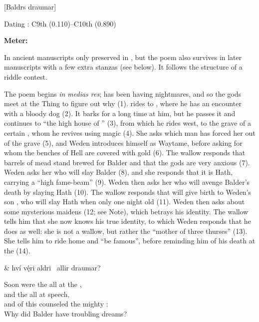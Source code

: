 [Baldrs draumar]

\begin{flushright}%
Dating \parencite{Sapp2022}: C9th (0.110)–C10th (0.890)

\textbf{Meter: }\Fornyrdislag%
\end{flushright}

In ancient manuscripts only preserved in \AM, but the poem also survives in later manuscripts with a few extra stanzas (see below). It follows the structure of a riddle contest.

The poem begins \emph{in medias res};  has been having nightmares, and so the gods meet at the Thing to figure out why (1).  rides to , where he has an encounter with a bloody dog (2). It barks for a long time at him, but he passes it and continues to “the high house of ” (3), from which he rides west, to the grave of a certain , whom he revives using magic (4). She asks which man has forced her out of the grave (5), and Weden introduces himself as Waytame, before asking for whom the benches of Hell are covered with gold (6). The wallow responds that barrels of mead stand brewed for Balder and that the gods are very anxious (7). Weden asks her who will slay Balder (8), and she responds that it is Hath, carrying a “high fame-beam” (9). Weden then asks her who will avenge Balder’s death by slaying Hath (10). The wallow responds that  will give birth to Weden’s son , who will slay Hath when only one night old (11). Weden then asks about some mysterious maidens (12; see Note), which betrays his identity. The wallow tells him that she now knows his true identity, to which Weden responds that he does as well: she is not a wallow, but rather the “mother of three thurses” (13). She tells him to ride home and “be famous”, before reminding him of his death at the  (14).

\sectionline

\bvg\bva{}%
 &
hví vę́ri aldri \hld\ allir draumar?\eva

\bvb Soon were the  all at the , \\
and the  all at speech, \\
and of this counseled the mighty : \\
Why did Balder have troubling dreams?\evb\evg


